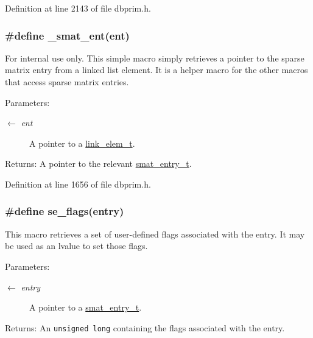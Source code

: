 Definition at line 2143 of file dbprim.h.\hypertarget{group__dbprim__smat_ga32}{
\subsubsection[\_\-smat\_\-ent]{\setlength{\rightskip}{0pt plus 5cm}\#define \_\-smat\_\-ent(ent)}}
\label{group__dbprim__smat_ga32}


\begin{Desc}
\item[For internal use only.]
This simple macro simply retrieves a pointer to the sparse matrix entry from a linked list element. It is a helper macro for the other macros that access sparse matrix entries.

\begin{Desc}
\item[Parameters:]
\begin{description}
\item[\mbox{$\leftarrow$} {\em ent}]A pointer to a \hyperlink{group__dbprim__link_ga1}{link\_\-elem\_\-t}.\end{description}
\end{Desc}
\begin{Desc}
\item[Returns:]A pointer to the relevant \hyperlink{group__dbprim__smat_ga2}{smat\_\-entry\_\-t}.\end{Desc}
\end{Desc}


Definition at line 1656 of file dbprim.h.\hypertarget{group__dbprim__smat_ga58}{
\subsubsection[se\_\-flags]{\setlength{\rightskip}{0pt plus 5cm}\#define se\_\-flags(entry)}}
\label{group__dbprim__smat_ga58}


This macro retrieves a set of user-defined flags associated with the entry. It may be used as an lvalue to set those flags.

\begin{Desc}
\item[Parameters:]
\begin{description}
\item[\mbox{$\leftarrow$} {\em entry}]A pointer to a \hyperlink{group__dbprim__smat_ga2}{smat\_\-entry\_\-t}.\end{description}
\end{Desc}
\begin{Desc}
\item[Returns:]An {\tt unsigned long} containing the flags associated with the entry.\end{Desc}


